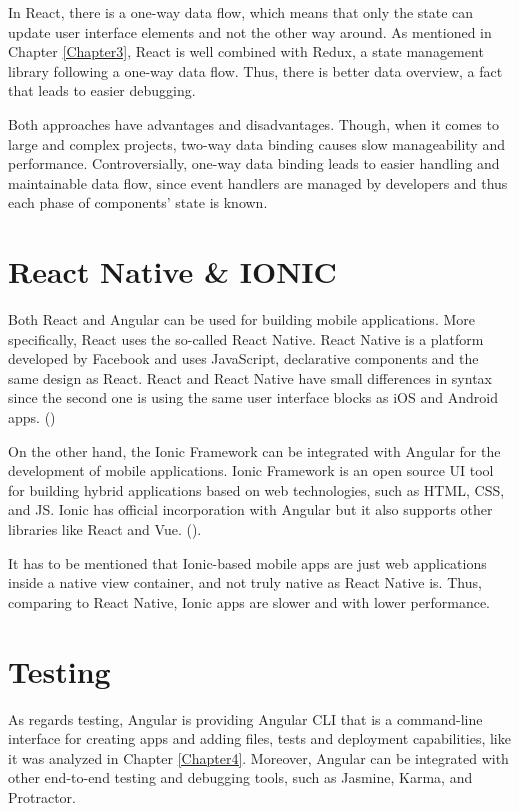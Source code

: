 In React, there is a one-way data flow, which means that only the state can update user interface elements and not the other way around. As mentioned in Chapter \ref{Chapter3}, React is well combined with Redux, a state management library following a one-way data flow. Thus, there is better data overview, a fact that leads to easier debugging. \par

Both approaches have advantages and disadvantages. Though, when it comes to large and complex projects, two-way data binding causes slow manageability and performance. Controversially, one-way data binding leads to easier handling and maintainable data flow, since event handlers are managed by developers and thus each phase of components' state is known. \par

\section{React Native \& IONIC}

Both React and Angular can be used for building mobile applications. More specifically, React uses the so-called React Native. React Native is a platform developed by Facebook and uses JavaScript, declarative components and the same design as React. React and React Native have small differences in syntax since the second one is using the same user interface blocks as iOS and Android apps. (\cite{Reference16}) \par

On the other hand, the Ionic Framework can be integrated with Angular for the development of mobile applications. Ionic Framework is an open source UI tool for building hybrid applications based on web technologies, such as HTML, CSS, and JS. Ionic has official incorporation with Angular but it also supports other libraries like React and Vue. (\cite{Ionic}). \par

It has to be mentioned that Ionic-based mobile apps are just web applications inside a native view container, and not truly native as React Native is. Thus, comparing to React Native, Ionic apps are slower and with lower performance. \par

\section{Testing}

As regards testing, Angular is providing Angular CLI that is a command-line interface for creating apps and adding files, tests and deployment capabilities, like it was analyzed in Chapter \ref{Chapter4}. Moreover, Angular can be integrated with other end-to-end testing and debugging tools, such as Jasmine, Karma, and Protractor. \par


